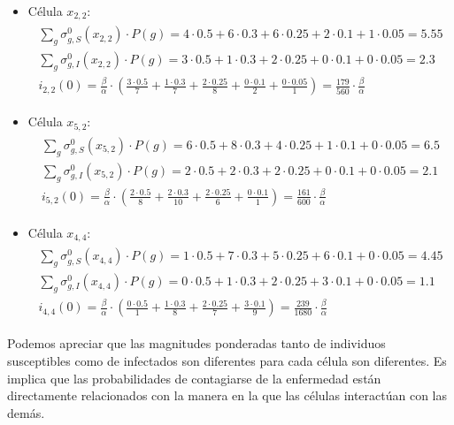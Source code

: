 \begin{example}
\begin{itemize}
    \item Célula $x_{2,2}$:
    \begin{align*}
    \begin{array}{l}
        \sum_g\sigma_{g,S}^0(x_{2,2})\cdot P(g) = 4\cdot0.5+6\cdot0.3+6\cdot0.25+2\cdot0.1+1\cdot0.05 = 5.55 \\
        \sum_g\sigma_{g,I}^0(x_{2,2})\cdot P(g) = 3\cdot0.5+1\cdot0.3+2\cdot0.25+0\cdot0.1+0\cdot0.05 = 2.3\\
        i_{2,2}(0) = \frac{\beta}{\alpha}\cdot\left(\frac{3\cdot0.5}{7}+\frac{1\cdot0.3}{7}+\frac{2\cdot0.25}{8}+\frac{0\cdot0.1}{2}+\frac{0\cdot0.05}{1}\right)=\frac{179}{560}\cdot\frac{\beta}{\alpha}
    \end{array}
    \end{align*}
    \item Célula $x_{5,2}$:
    \begin{align*}
    \begin{array}{l}
        \sum_g\sigma_{g,S}^0(x_{5,2})\cdot P(g) = 6\cdot0.5+8\cdot0.3+4\cdot0.25+1\cdot0.1+0\cdot0.05 = 6.5 \\
        \sum_g\sigma_{g,I}^0(x_{5,2})\cdot P(g) = 2\cdot0.5+2\cdot0.3+2\cdot0.25+0\cdot0.1+0\cdot0.05 = 2.1\\
        i_{5,2}(0) = \frac{\beta}{\alpha}\cdot\left(\frac{2\cdot0.5}{8}+\frac{2\cdot0.3}{10}+\frac{2\cdot0.25}{6}+\frac{0\cdot0.1}{1}\right)=\frac{161}{600}\cdot\frac{\beta}{\alpha}
    \end{array}
    \end{align*}
    \item Célula $x_{4,4}$:
    \begin{align*}
    \begin{array}{l}
        \sum_g\sigma_{g,S}^0(x_{4,4})\cdot P(g) = 1\cdot0.5+7\cdot0.3+5\cdot0.25+6\cdot0.1+0\cdot0.05 = 4.45 \\
        \sum_g\sigma_{g,I}^0(x_{4,4})\cdot P(g) = 0\cdot0.5+1\cdot0.3+2\cdot0.25+3\cdot0.1+0\cdot0.05 = 1.1\\
        i_{4,4}(0) = \frac{\beta}{\alpha}\cdot\left(\frac{0\cdot0.5}{1}+\frac{1\cdot0.3}{8}+\frac{2\cdot0.25}{7}+\frac{3\cdot0.1}{9}\right)=\frac{239}{1680}\cdot\frac{\beta}{\alpha}
    \end{array}
    \end{align*}
\end{itemize}

Podemos apreciar que las magnitudes ponderadas tanto de individuos susceptibles como de infectados son diferentes para cada célula son diferentes. Es implica que las probabilidades de contagiarse de la enfermedad están directamente relacionados con la manera en la que las células interactúan con las demás.\la


\end{example}
